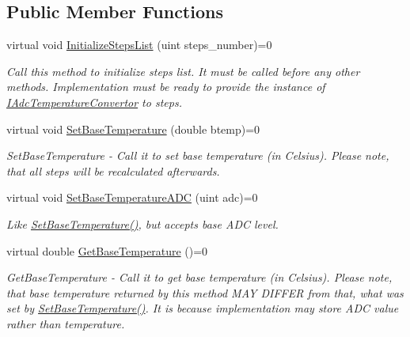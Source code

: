 \subsection*{Public Member Functions}
\begin{DoxyCompactItemize}
\item 
virtual void \hyperlink{class_interfaces_1_1_i_settings_generator_a4aa0307e906c003012aad75101072c65}{Initialize\+Steps\+List} (uint steps\+\_\+number)=0
\begin{DoxyCompactList}\small\item\em Call this method to initialize steps list. It must be called before any other methods. Implementation must be ready to provide the instance of \hyperlink{class_interfaces_1_1_i_adc_temperature_convertor}{I\+Adc\+Temperature\+Convertor} to steps. \end{DoxyCompactList}\item 
virtual void \hyperlink{class_interfaces_1_1_i_settings_generator_a8b60ba05790994db0303b251f655e95d}{Set\+Base\+Temperature} (double btemp)=0
\begin{DoxyCompactList}\small\item\em Set\+Base\+Temperature -\/ Call it to set base temperature (in Celsius). Please note, that all steps will be recalculated afterwards. \end{DoxyCompactList}\item 
virtual void \hyperlink{class_interfaces_1_1_i_settings_generator_af681d36295e95bd52cbfd1bbc3ae8cf9}{Set\+Base\+Temperature\+A\+DC} (uint adc)=0
\begin{DoxyCompactList}\small\item\em Like \hyperlink{class_interfaces_1_1_i_settings_generator_a8b60ba05790994db0303b251f655e95d}{Set\+Base\+Temperature()}, but accepts base A\+DC level. \end{DoxyCompactList}\item 
virtual double \hyperlink{class_interfaces_1_1_i_settings_generator_a9cc36185b446f21e09a0e5633f39a1c5}{Get\+Base\+Temperature} ()=0
\begin{DoxyCompactList}\small\item\em Get\+Base\+Temperature -\/ Call it to get base temperature (in Celsius). Please note, that base temperature returned by this method M\+AY D\+I\+F\+F\+ER from that, what was set by \hyperlink{class_interfaces_1_1_i_settings_generator_a8b60ba05790994db0303b251f655e95d}{Set\+Base\+Temperature()}. It is because implementation may store A\+DC value rather than temperature. \end{DoxyCompactList}\item 

\end{DoxyCompactItemize}
